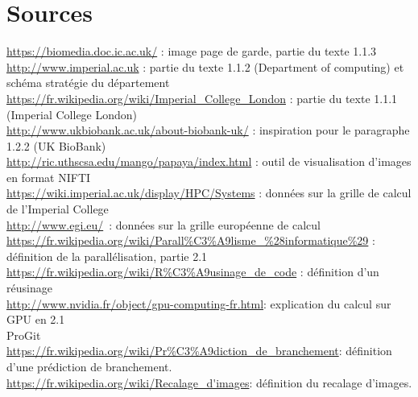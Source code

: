 \documentclass[10pt]{report}
\begin{document}
\chapter*{Sources}
\noindent
\url{https://biomedia.doc.ic.ac.uk/}  : image page de garde, partie du texte 1.1.3 \\
\url{http://www.imperial.ac.uk} : partie du texte 1.1.2 (Department of computing) et schéma stratégie du département\\
\url{https://fr.wikipedia.org/wiki/Imperial_College_London} : partie du texte 1.1.1 (Imperial College London)\\
\url{http://www.ukbiobank.ac.uk/about-biobank-uk/} : inspiration pour le paragraphe 1.2.2 (UK BioBank)\\
\url{http://ric.uthscsa.edu/mango/papaya/index.html} : outil de visualisation d'images en format NIFTI\\
\url{https://wiki.imperial.ac.uk/display/HPC/Systems} : données sur la grille de calcul de l'Imperial College\\
\url{http://www.egi.eu/} : données sur la grille européenne de calcul\\
\url{https://fr.wikipedia.org/wiki/Parall\%C3\%A9lisme_\%28informatique\%29} : définition de la parallélisation, partie 2.1\\
\url{https://fr.wikipedia.org/wiki/R\%C3\%A9usinage_de_code} :  définition d'un réusinage \\
\url{http://www.nvidia.fr/object/gpu-computing-fr.html}: explication du calcul sur GPU en 2.1\\
ProGit\\
\url{https://fr.wikipedia.org/wiki/Pr\%C3\%A9diction_de_branchement}: définition d'une prédiction de branchement.\\
\url{https://fr.wikipedia.org/wiki/Recalage_d'images}: définition du recalage d'images.\\
\renewcommand{\listfigurename}{Table des illustations}\listoffigures 
{}
\end{document}
